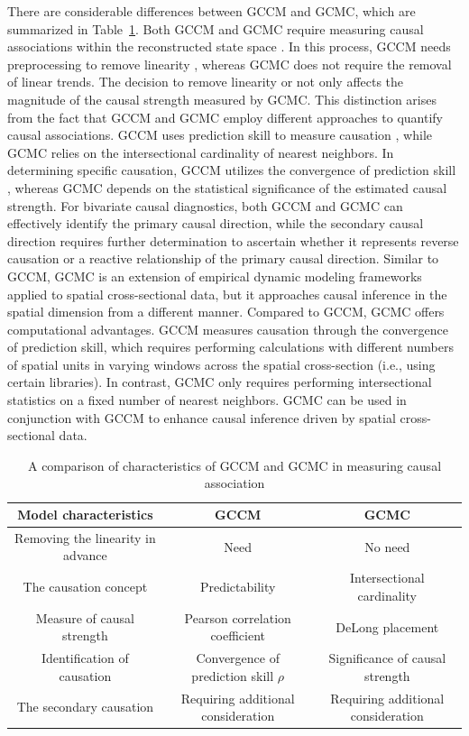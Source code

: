 \documentclass[authoryear,preprint,review,12pt]{elsarticle}
\begin{document}
There are considerable differences between GCCM and GCMC, which are summarized in Table~\ref{tbl_diff}. Both GCCM and GCMC require measuring causal associations within the reconstructed state space \citep{Takens1981embedding,Mane1981embedding,sugihara2012ccm}. In this process, GCCM needs preprocessing to remove linearity \citep{gao2023gccm}, whereas GCMC does not require the removal of linear trends. The decision to remove linearity or not only affects the magnitude of the causal strength measured by GCMC. This distinction arises from the fact that GCCM and GCMC employ different approaches to quantify causal associations. GCCM uses prediction skill to measure causation \citep{sugihara2012ccm,gao2023gccm}, while GCMC relies on the intersectional cardinality of nearest neighbors. In determining specific causation, GCCM utilizes the convergence of prediction skill \citep{sugihara2012ccm,gao2023gccm}, whereas GCMC depends on the statistical significance of the estimated causal strength. For bivariate causal diagnostics, both GCCM and GCMC can effectively identify the primary causal direction, while the secondary causal direction requires further determination to ascertain whether it represents reverse causation or a reactive relationship of the primary causal direction. Similar to GCCM, GCMC is an extension of empirical dynamic modeling frameworks applied to spatial cross-sectional data, but it approaches causal inference in the spatial dimension from a different manner. Compared to GCCM, GCMC offers computational advantages. GCCM measures causation through the convergence of prediction skill, which requires performing calculations with different numbers of spatial units in varying windows across the spatial cross-section (i.e., using certain libraries). In contrast, GCMC only requires performing intersectional statistics on a fixed number of nearest neighbors. GCMC can be used in conjunction with GCCM to enhance causal inference driven by spatial cross-sectional data.

\begin{table}[htb]
\centering
\caption{A comparison of characteristics of GCCM and GCMC in measuring causal association}
\label{tbl_diff}
{\scriptsize
\begin{tabular}{|c|c|c|}
\hline
\textbf{Model characteristics} & \textbf{GCCM} & \textbf{GCMC} \\
\hline
Removing the linearity in advance & Need & No need \\
\hline
The causation concept & Predictability & Intersectional cardinality \\
\hline
Measure of causal strength & Pearson correlation coefficient & DeLong placement \\ 
\hline
Identification of causation & Convergence of prediction skill \(\rho\) & Significance of causal strength \\
\hline
The secondary causation &
Requiring additional consideration & Requiring additional consideration \\
\hline
\end{tabular}
}
\end{table}
\end{document}
